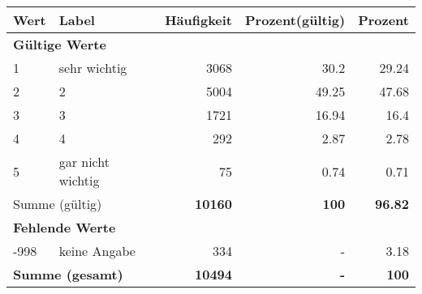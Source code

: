      \begin{longtable}{lXrrr}
     \toprule
     \textbf{Wert} & \textbf{Label} & \textbf{Häufigkeit} & \textbf{Prozent(gültig)} & \textbf{Prozent} \\
     \endhead
     \midrule
     \multicolumn{5}{l}{\textbf{Gültige Werte}}\\

     1 &
     \multicolumn{1}{X}{ sehr wichtig   } &


       \num{3068} &
       \num[round-mode=places,round-precision=2]{30.2} &
         \num[round-mode=places,round-precision=2]{29.24} \\

     2 &
     \multicolumn{1}{X}{ 2   } &


       \num{5004} &
       \num[round-mode=places,round-precision=2]{49.25} &
         \num[round-mode=places,round-precision=2]{47.68} \\

     3 &
     \multicolumn{1}{X}{ 3   } &


       \num{1721} &
       \num[round-mode=places,round-precision=2]{16.94} &
         \num[round-mode=places,round-precision=2]{16.4} \\

     4 &
     \multicolumn{1}{X}{ 4   } &


       \num{292} &
       \num[round-mode=places,round-precision=2]{2.87} &
         \num[round-mode=places,round-precision=2]{2.78} \\

     5 &
     \multicolumn{1}{X}{ gar nicht wichtig   } &


       \num{75} &
       \num[round-mode=places,round-precision=2]{0.74} &
         \num[round-mode=places,round-precision=2]{0.71} \\
     \midrule
     \multicolumn{2}{l}{Summe (gültig)} &
       \textbf{\num{10160}} &
     \textbf{\num{100}} &
       \textbf{\num[round-mode=places,round-precision=2]{96.82}} \\
     \multicolumn{5}{l}{\textbf{Fehlende Werte}}\\
       -998 &
       keine Angabe &
         \num{334} &
        - &
         \num[round-mode=places,round-precision=2]{3.18} \\
     \midrule
     \multicolumn{2}{l}{\textbf{Summe (gesamt)}} &
          \textbf{\num{10494}} &
        \textbf{-} &
        \textbf{\num{100}} \\
     \bottomrule
     \end{longtable}
     
